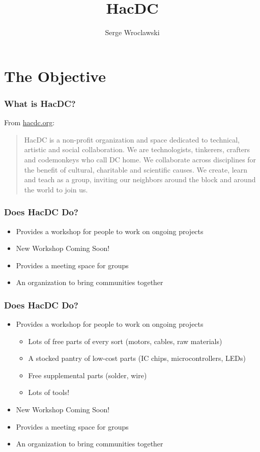\documentclass[notes]{beamer}
\title{HacDC}
\author{Serge Wroclawski}
\begin{document}
\section{The Objective}

\begin{frame}
  \frametitle{What is HacDC?}
  From \href{http://www.hacdc.org}{hacdc.org}:
  \begin{quote}
    HacDC is a non-profit organization and space dedicated to
    technical, artistic and social collaboration. We are
    technologists, tinkerers, crafters and codemonkeys who call DC
    home. We collaborate across disciplines for the benefit of
    cultural, charitable and scientific causes. We create, learn and
    teach as a group, inviting our neighbors around the block and
    around the world to join us.
  \end{quote}
\end{frame}

\begin{frame}
  \frametitle{Does HacDC Do?}
  \begin{itemize}
  \item Provides a workshop for people to work on ongoing projects
  \item New Workshop Coming Soon!
  \item Provides a meeting space for groups
  \item An organization to bring communities together
  \end{itemize}
\end{frame}

\begin{frame}
  \frametitle{Does HacDC Do?}
  \begin{itemize}
  \item Provides a workshop for people to work on ongoing projects
    \begin{itemize}
    \item Lots of free parts of every sort (motors, cables, raw materials)
    \item A stocked pantry of low-cost parts (IC chips, microcontrollers, LEDs)
    \item Free supplemental parts (solder, wire)
    \item Lots of tools!
    \end{itemize}
  \item New Workshop Coming Soon!
  \item Provides a meeting space for groups
  \item An organization to bring communities together
  \end{itemize}
\end{frame}
\end{document}
